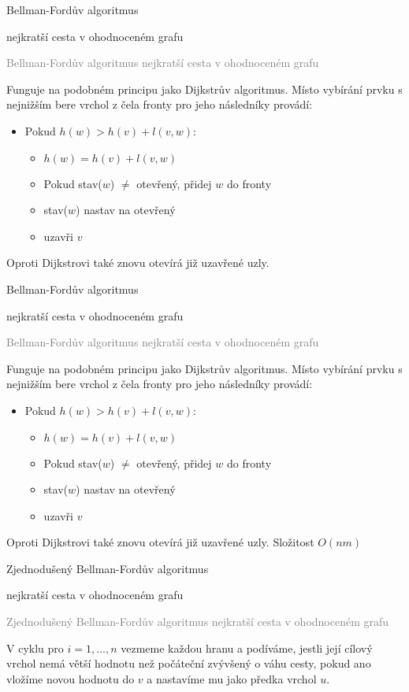 \documentclass[20pt]{extarticle}
\newcommand{\card}[3][]{
	\vspace*{\fill}

	\newpage
	\topskip0pt
	\vspace*{\fill}
		\Large #2

		\vspace{1cm}
		\normalsize #1
	\vspace*{\fill}
	\newpage

	\small \textcolor{gray}{#2 #1}
	\topskip0pt
	\vspace*{\fill}

	\normalsize
	#3
	\vspace*{\fill}
}
\begin{document}
\begin{center}
\card[nejkratší cesta v ohodnoceném grafu]{Bellman-Fordův algoritmus}{
    \footnotesize
	Funguje na podobném principu jako Dijkstrův algoritmus. Místo vybírání
	prvku s nejnižším bere vrchol z čela fronty pro jeho následníky provádí:
	\begin{itemize}
		\item Pokud $h(w) > h(v) + l(v, w)$:
		\begin{itemize}
			\item $h(w) = h(v) + l(v, w)$
			\item Pokud stav($w$) $\neq$ otevřený, přidej $w$ do fronty
			\item stav($w$) nastav na otevřený
			\item uzavři $v$
		\end{itemize}
	\end{itemize}
	Oproti Dijkstrovi také znovu otevírá již uzavřené uzly.
	\normalsize
}

\card[nejkratší cesta v ohodnoceném grafu]{Bellman-Fordův algoritmus}{
    \footnotesize
	Funguje na podobném principu jako Dijkstrův algoritmus. Místo vybírání
	prvku s nejnižším bere vrchol z čela fronty pro jeho následníky provádí:
	\begin{itemize}
		\item Pokud $h(w) > h(v) + l(v, w)$:
		\begin{itemize}
			\item $h(w) = h(v) + l(v, w)$
			\item Pokud stav($w$) $\neq$ otevřený, přidej $w$ do fronty
			\item stav($w$) nastav na otevřený
			\item uzavři $v$
		\end{itemize}
	\end{itemize}
	Oproti Dijkstrovi také znovu otevírá již uzavřené uzly. Složitost $O(nm)$
	\normalsize
}

\card[nejkratší cesta v ohodnoceném grafu]{Zjednodušený Bellman-Fordův algoritmus}{
	V cyklu pro $i = 1, \dots, n$ vezmeme každou hranu a podíváme, jestli
	její cílový vrchol nemá větší hodnotu než počáteční zvývšený o váhu cesty, pokud ano
	vložíme novou hodnotu do $v$ a nastavíme mu jako předka vrchol $u$.
}

\end{center}
\end{document}
